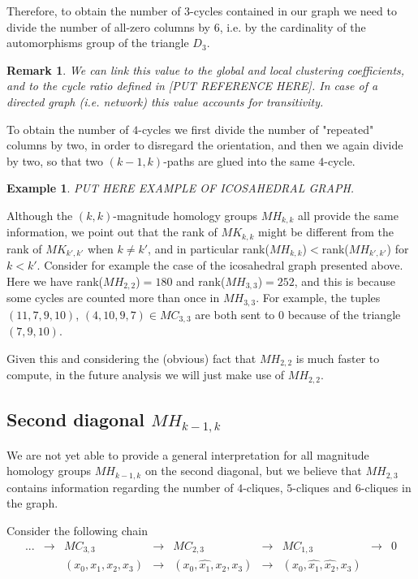 \documentclass{article}
\newtheorem{remark}[theorem]{Remark}
\newtheorem{example}[theorem]{Example}
\begin{document}
	Therefore, to obtain the number of $3$-cycles contained in our graph we need to divide the number of all-zero columns by $6$, i.e. by the cardinality of the automorphisms group of the triangle $D_3$.
	
	\begin{remark}
		We can link this value to the global and local clustering coefficients, and to the cycle ratio defined in [PUT REFERENCE HERE].
		In case of a directed graph (i.e. network) this value accounts for transitivity.
	\end{remark}
	
	To obtain the number of $4$-cycles we first divide the number of "repeated" columns by two, in order to disregard the orientation, and then we again divide by two, so that two $(k-1,k)$-paths are glued into the same $4$-cycle.
	
	\begin{example}
		PUT HERE EXAMPLE OF ICOSAHEDRAL GRAPH.
	\end{example}
	
	Although the $(k,k)$-magnitude homology groups $MH_{k,k}$ all provide the same information, we point out that the rank of $MK_{k,k}$ might be different from the rank of $MK_{k',k'}$ when $k \neq k'$, and in particular rank($MH_{k,k}$)$<$rank($MH_{k',k'}$) for $k<k'$. 
	Consider for example the case of the icosahedral graph presented above.
	Here we have rank($MH_{2,2}$)$=180$ and rank($MH_{3,3}$)$=252$, and this is because some cycles are counted more than once in $MH_{3,3}$.
	For example, the tuples $(11,7,9,10)$, $(4,10,9,7) \in MC_{3,3}$ are both sent to $0$ because of the triangle $(7,9,10)$.
	
	Given this and considering the (obvious) fact that $MH_{2,2}$ is much faster to compute, in the future analysis we will just make use of $MH_{2,2}$.
	
	\subsection{Second diagonal $MH_{k-1,k}$}
	We are not yet able to provide a general interpretation for all magnitude homology groups $MH_{k-1,k}$ on the second diagonal, but we believe that $MH_{2,3}$ contains information regarding the number of $4$-cliques, $5$-cliques and $6$-cliques in the graph.
	
	Consider the following chain
	\begin{equation*}
		\begin{matrix}
			... &\to & MC_{3,3}          &\to & MC_{2,3}                &\to & MC_{1,3} &\to & 0 \\
			&    & (x_0,x_1,x_2,x_3) &\to & (x_0,\hat{x_1},x_2,x_3) &\to & (x_0,\hat{x_1},\hat{x_2},x_3) & &
		\end{matrix}
	\end{equation*}
	
\end{document}
